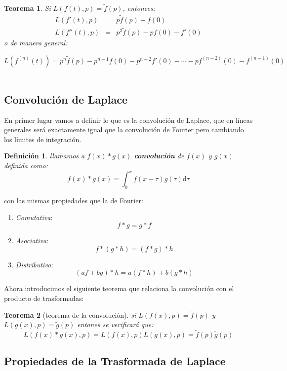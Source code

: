 \documentclass[12pt]{book}
\newcommand{\D}{\mathrm{d}}
\newtheorem{theorem}{Teorema}[section]
\newtheorem{definicion}{Definición}[section]
\begin{document}
\begin{theorem}
Si $L(f(t),p) = \tilde{f}(p)$, entonces:
$$ \begin{array}{rll}  L(f'(t),p) & =  & p \tilde{f}(p)  - f(0) \\
L(f''(t),p) & = & p^2 \tilde{f}(p)-pf(0)-f'(0) \end{array} $$
o de manera general:

$$ L(f^{(n)} (t)) = p^n \tilde{f}(p) - p^{n-1} f(0) - p^{n-2} f'(0)- \cdots - pf^{(n-2)}(0) - f^{(n-1)}(0) $$\\
\end{theorem}


\subsection{Convolución de Laplace}

En primer lugar vamos a definir lo que es la convolución de Laplace, que en líneas generales será exactamente igual que la convolución de Fourier pero cambiando los límites de integración. 

\begin{definicion}
llamamos a $f(x)*g(x)$ \textbf{convolución} de $f(x)$ y $g(x)$ definida como:
$$ f(x)*g(x) = \int_0^x f(x- \tau) g(\tau) \D \tau $$
\end{definicion}

con las mismas propiedades que la de Fourier:

\begin{enumerate}
\item \textit{Comutativa}: $$ f * g = g * f $$
\item \textit{Asociativa}: $$ f * (g * h) = (f * g) * h $$
\item \textit{Distributiva}: $$ (a f + b g) * h = a (f * h) + b (g * h) $$
\end{enumerate}


Ahora introducimos el siguiente teorema que relaciona la convolución con el producto de trasformadas:

\begin{theorem}[teorema de la convolución]
si $L(f(x),p) = \tilde{f}(p)$ y $L(g(x),p) = \tilde{g}(p)$ entones se verificará que:
$$ L(f(x) * g(x),p) = L(f(x),p) L(g(x),p) = \tilde{f}(p) \tilde{g}(p) $$
\end{theorem}

\subsection{Propiedades de la Trasformada de Laplace}
\end{document}
